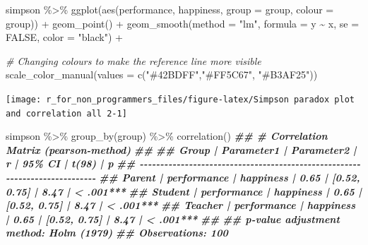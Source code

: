 \documentclass[
]{book}
\newenvironment{Shaded}{\begin{snugshade}}{\end{snugshade}}
\newcommand{\AttributeTok}[1]{\textcolor[rgb]{0.77,0.63,0.00}{#1}}
\newcommand{\CommentTok}[1]{\textcolor[rgb]{0.56,0.35,0.01}{\textit{#1}}}
\newcommand{\ConstantTok}[1]{\textcolor[rgb]{0.00,0.00,0.00}{#1}}
\newcommand{\DocumentationTok}[1]{\textcolor[rgb]{0.56,0.35,0.01}{\textbf{\textit{#1}}}}
\newcommand{\FunctionTok}[1]{\textcolor[rgb]{0.00,0.00,0.00}{#1}}
\newcommand{\NormalTok}[1]{#1}
\newcommand{\SpecialCharTok}[1]{\textcolor[rgb]{0.00,0.00,0.00}{#1}}
\newcommand{\StringTok}[1]{\textcolor[rgb]{0.31,0.60,0.02}{#1}}
\begin{document}
\begin{Shaded}
\begin{Highlighting}[]
\NormalTok{simpson }\SpecialCharTok{\%\textgreater{}\%} 
  \FunctionTok{ggplot}\NormalTok{(}\FunctionTok{aes}\NormalTok{(performance, happiness, }\AttributeTok{group =}\NormalTok{ group, }\AttributeTok{colour =}\NormalTok{ group)) }\SpecialCharTok{+}
  \FunctionTok{geom\_point}\NormalTok{() }\SpecialCharTok{+}
  \FunctionTok{geom\_smooth}\NormalTok{(}\AttributeTok{method =} \StringTok{"lm"}\NormalTok{,}
              \AttributeTok{formula =}\NormalTok{ y }\SpecialCharTok{\textasciitilde{}}\NormalTok{ x,}
              \AttributeTok{se =} \ConstantTok{FALSE}\NormalTok{,}
              \AttributeTok{color =} \StringTok{"black"}\NormalTok{) }\SpecialCharTok{+}
  
  \CommentTok{\# Changing colours to make the reference line more visible}
  \FunctionTok{scale\_color\_manual}\NormalTok{(}\AttributeTok{values =} \FunctionTok{c}\NormalTok{(}\StringTok{"\#42BDFF"}\NormalTok{,}\StringTok{"\#FF5C67"}\NormalTok{, }\StringTok{"\#B3AF25"}\NormalTok{))}
\end{Highlighting}
\end{Shaded}

\begin{center}\texttt{[image: r\_for\_non\_programmers\_files/figure-latex/Simpson paradox plot and correlation all 2-1]} \end{center}

\begin{Shaded}
\begin{Highlighting}[]
\NormalTok{simpson }\SpecialCharTok{\%\textgreater{}\%} 
  \FunctionTok{group\_by}\NormalTok{(group) }\SpecialCharTok{\%\textgreater{}\%} 
  \FunctionTok{correlation}\NormalTok{()}
\DocumentationTok{\#\# \# Correlation Matrix (pearson{-}method)}
\DocumentationTok{\#\# }
\DocumentationTok{\#\# Group   |  Parameter1 | Parameter2 |    r |       95\% CI | t(98) |         p}
\DocumentationTok{\#\# {-}{-}{-}{-}{-}{-}{-}{-}{-}{-}{-}{-}{-}{-}{-}{-}{-}{-}{-}{-}{-}{-}{-}{-}{-}{-}{-}{-}{-}{-}{-}{-}{-}{-}{-}{-}{-}{-}{-}{-}{-}{-}{-}{-}{-}{-}{-}{-}{-}{-}{-}{-}{-}{-}{-}{-}{-}{-}{-}{-}{-}{-}{-}{-}{-}{-}{-}{-}{-}{-}{-}{-}{-}{-}{-}{-}}
\DocumentationTok{\#\# Parent  | performance |  happiness | 0.65 | [0.52, 0.75] |  8.47 | \textless{} .001***}
\DocumentationTok{\#\# Student | performance |  happiness | 0.65 | [0.52, 0.75] |  8.47 | \textless{} .001***}
\DocumentationTok{\#\# Teacher | performance |  happiness | 0.65 | [0.52, 0.75] |  8.47 | \textless{} .001***}
\DocumentationTok{\#\# }
\DocumentationTok{\#\# p{-}value adjustment method: Holm (1979)}
\DocumentationTok{\#\# Observations: 100}
\end{Highlighting}
\end{Shaded}
\end{document}
